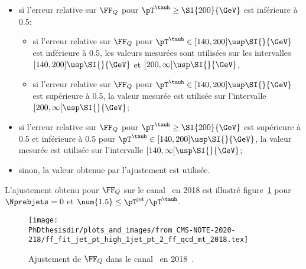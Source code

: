 \begin{itemize}
\item si l'erreur relative sur $\FF_Q$ pour $\pT^{\tauh}\geq\SI{200}{\GeV}$ est inférieure à \num{0.5}:
\begin{itemize}
\item si l'erreur relative sur $\FF_Q$ pour $\pT^{\tauh}\in[140, 200]\usp\SI{}{\GeV}$ est inférieure à \num{0.5}, les valeurs mesurées sont utilisées sur les intervalles $[140, 200]\usp\SI{}{\GeV}$ et $[200, \infty[\usp\SI{}{\GeV}$,
\item si l'erreur relative sur $\FF_Q$ pour $\pT^{\tauh}\in[140, 200]\usp\SI{}{\GeV}$ est supérieure à \num{0.5}, la valeur mesurée est utilisée sur l'intervalle $[200, \infty[\usp\SI{}{\GeV}$;
\end{itemize}
\item si l'erreur relative sur $\FF_Q$ pour $\pT^{\tauh}\geq\SI{200}{\GeV}$ est supérieure à \num{0.5}
et inférieure à \num{0.5} pour $\pT^{\tauh}\in[140, 200]\usp\SI{}{\GeV}$,
la valeur mesurée est utilisée sur l'intervalle $[140, \infty[\usp\SI{}{\GeV}$;
\item sinon, la valeur obtenue par l'ajustement est utilisée.
\end{itemize}
L'ajustement obtenu pour $\FF_Q$ sur le canal \mu\tauh\ en 2018 est illustré figure~\ref{fig-chapter-HTT_analysis-section-bg_estimation-FF_method-FFQ_fit} pour $\Nprebjets=0$ et $\num{1.5} \leq \pT^\text{jet}/\pT^{\tauh}$.
\begin{figure}[h]
\centering
\texttt{[image: \\PhDthesisdir/plots\_and\_images/from\_CMS-NOTE-2020-218/ff\_fit\_jet\_pt\_high\_1jet\_pt\_2\_ff\_qcd\_mt\_2018.tex]}
\caption[Ajustement de $\FF_Q$ dans le canal \mu\tauh\ en 2018.]{Ajustement de $\FF_Q$ dans le canal \mu\tauh\ en 2018~\cite{CMS-NOTE-2020-218}.}
\label{fig-chapter-HTT_analysis-section-bg_estimation-FF_method-FFQ_fit}
\end{figure}
